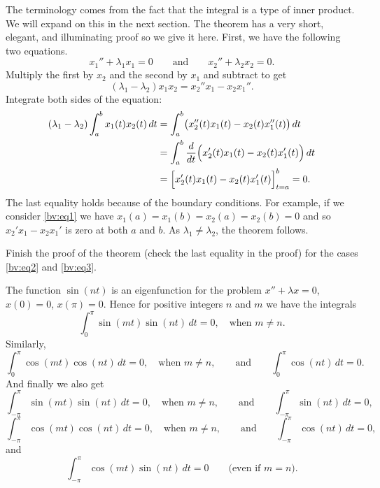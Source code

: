 The terminology comes from the fact that the integral is a type of
inner product.  We will expand on this in the next section.  The theorem
has a very short, elegant, and illuminating proof so we give it here.
First, we have the following two equations.
\begin{equation*}
x_1'' + \lambda_1 x_1 = 0
\qquad \text{and} \qquad
x_2'' + \lambda_2 x_2 = 0.
\end{equation*}
Multiply the first by $x_2$ and the second by $x_1$ and subtract to get
\begin{equation*}
(\lambda_1 - \lambda_2) x_1 x_2 = x_2'' x_1 - x_2 x_1'' .
\end{equation*}
Integrate both sides of the equation:
\begin{equation*}
\begin{split}
(\lambda_1 - \lambda_2) \int_a^b x_1(t) x_2(t) \,dt
& =
\int_a^b \bigl( x_2''(t) x_1(t) - x_2(t) x_1''(t) \bigr) \,dt \\
& =
\int_a^b \frac{d}{dt} \Bigl( x_2'(t) x_1(t) - x_2(t) x_1'(t) \Bigr) \,dt \\
& =
\Bigl[ x_2'(t) x_1(t) - x_2(t) x_1'(t) \Bigr]_{t=a}^b
= 0 .
\end{split}
\end{equation*}
The last equality holds because of the boundary conditions.  For example, if
we consider \eqref{bv:eq1} we have $x_1(a) = x_1(b) = x_2(a) = x_2(b) = 0$
and so $x_2' x_1 - x_2 x_1'$ is zero at both $a$ and $b$.
As $\lambda_1 \not= \lambda_2$, the theorem follows.

\begin{exercise}[easy]
Finish the proof of the theorem (check the last equality in the proof) for the cases
\eqref{bv:eq2} and \eqref{bv:eq3}.
\end{exercise}

The function $\sin (n t)$ is an eigenfunction for the problem
$x''+\lambda x = 0$, $x(0) = 0$, $x(\pi) = 0$. 
Hence for positive
integers $n$ and $m$ we have the integrals
\begin{equation*}
\int_{0}^\pi \sin (mt) \sin (nt) \,dt = 0 ,
\quad
\text{when } m \not = n.
\end{equation*}
Similarly,
\begin{equation*}
\int_{0}^\pi \cos (mt) \cos (nt) \,dt = 0 ,
\quad
\text{when } m \not = n,
\qquad \text{and} \qquad
\int_{0}^\pi  \cos (nt) \,dt = 0 .
\end{equation*}
And finally we also get
\begin{equation*}
\int_{-\pi}^\pi \sin (mt) \sin (nt) \,dt = 0 ,
\quad
\text{when } m \not = n, 
\qquad \text{and} \qquad
\int_{-\pi}^\pi  \sin (nt) \,dt = 0 ,
\end{equation*}
\begin{equation*}
\int_{-\pi}^\pi \cos (mt) \cos (nt) \,dt = 0 ,
\quad
\text{when } m \not = n,
\qquad \text{and} \qquad
\int_{-\pi}^\pi  \cos (nt) \,dt = 0 ,
\end{equation*}
and
\begin{equation*}
\int_{-\pi}^\pi \cos (mt) \sin (nt) \,dt = 0 
\qquad \text{(even if $m=n$).}
\end{equation*}

